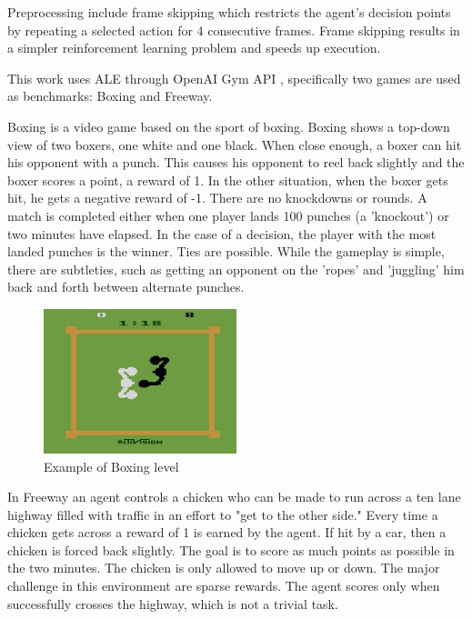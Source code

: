 Preprocessing include frame skipping \cite{Study.FrameSkipping} which restricts the agent’s decision points by repeating a selected action for 4 consecutive frames. Frame skipping results in a simpler reinforcement learning problem and speeds up execution.

This work uses ALE through OpenAI Gym API \cite{Code.OpenAIGym}, specifically two games are used as benchmarks: Boxing and Freeway.

Boxing is a video game based on the sport of boxing. Boxing shows a top-down view of two boxers, one white and one black. When close enough, a boxer can hit his opponent with a punch. This causes his opponent to reel back slightly and the boxer scores a point, a reward of 1. In the other situation, when the boxer gets hit, he gets a negative reward of -1. There are no knockdowns or rounds. A match is completed either when one player lands 100 punches (a 'knockout') or two minutes have elapsed. In the case of a decision, the player with the most landed punches is the winner. Ties are possible. 
While the gameplay is simple, there are subtleties, such as getting an opponent on the 'ropes' and 'juggling' him back and forth between alternate punches. 

\begin{figure}[H]
\includegraphics[width=0.5\textwidth,keepaspectratio]{figures/Boxing.jpg}
\caption[Boxing]{Example of Boxing level}
\label{Fig.Boxing}
\end{figure}

In Freeway an agent controls a chicken who can be made to run across a ten lane highway filled with traffic in an effort to "get to the other side." Every time a chicken gets across a reward of 1 is earned by the agent. If hit by a car, then a chicken is forced back slightly. The goal is to score as much points as possible in the two minutes. The chicken is only allowed to move up or down. 
The major challenge in this environment are sparse rewards. The agent scores only when successfully crosses the highway, which is not a trivial task.

